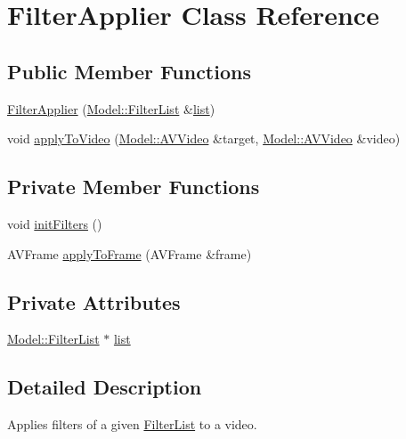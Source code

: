 \hypertarget{classModel_1_1FilterApplier}{}\section{Filter\+Applier Class Reference}
\label{classModel_1_1FilterApplier}
\subsection*{Public Member Functions}
\begin{DoxyCompactItemize}
\item 
\hyperlink{classModel_1_1FilterApplier_ac17d08b323fb1e56dc2fb0a08eda926d}{Filter\+Applier} (\hyperlink{classModel_1_1FilterList}{Model\+::\+Filter\+List} \&\hyperlink{classModel_1_1FilterApplier_a80412703a258894c4e17f84bfccc08b9}{list})
\item 
void \hyperlink{classModel_1_1FilterApplier_a5931fdefc866a4f03123e9fc4e797601}{apply\+To\+Video} (\hyperlink{classModel_1_1AVVideo}{Model\+::\+A\+V\+Video} \&target, \hyperlink{classModel_1_1AVVideo}{Model\+::\+A\+V\+Video} \&video)
\end{DoxyCompactItemize}
\subsection*{Private Member Functions}
\begin{DoxyCompactItemize}
\item 
void \hyperlink{classModel_1_1FilterApplier_a2deffc5b57ae773bc38edb096be31bd6}{init\+Filters} ()
\item 
A\+V\+Frame \hyperlink{classModel_1_1FilterApplier_a32cfe2ae1bcfded94c8f52322719b3be}{apply\+To\+Frame} (A\+V\+Frame \&frame)
\end{DoxyCompactItemize}
\subsection*{Private Attributes}
\begin{DoxyCompactItemize}
\item 
\hyperlink{classModel_1_1FilterList}{Model\+::\+Filter\+List} $\ast$ \hyperlink{classModel_1_1FilterApplier_a80412703a258894c4e17f84bfccc08b9}{list}
\end{DoxyCompactItemize}


\subsection{Detailed Description}
Applies filters of a given \hyperlink{classModel_1_1FilterList}{Filter\+List} to a video. 

